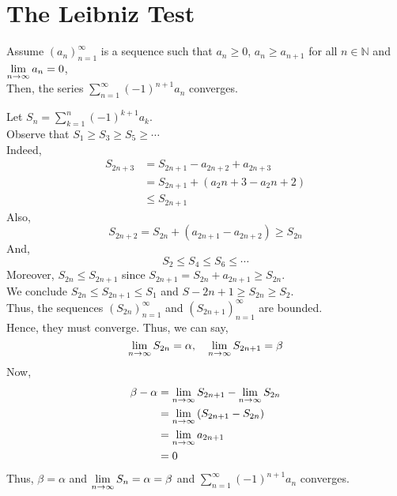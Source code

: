 \documentclass[12pt]{article}
\begin{document}
\section{The Leibniz Test}
\begin{theo}{}
Assume \(\left(a_n\right)_{n=1}^\infty\) is a sequence such that \(a_n \ge 0\), \(a_n \ge a_{n+1}\) for all \(n\in \mathbb N\) and \(\displaystyle\lim_{n\to\infty} a_n = 0\),\\
Then, the series \(\displaystyle\sum_{n=1}^\infty(-1)^{n+1}a_n\) converges.\\   
\end{theo}
\begin{prf}{}
Let \(S_n  = \displaystyle\sum_{k=1}^n(-1)^{k+1}a_k\).\\
Observe that \(S_1 \ge S_3 \ge S_5 \ge \cdots\)\\
Indeed, 
\begin{align*}
    S_{2n+3} &= S_{2n+1} - a_{2n + 2} + a_{2n+3}\\
    &= S_{2n+1} + \left(a_2n+3 - a_2n+2\right)\\
    &\le S_{2n+1}
\end{align*}  
Also, \[S_{2n+2} = S_{2n} + \left(a_{2n+1} - a_{2n+2}\right) \ge S_{2n} \]
And, \[S_2 \le S_4 \le S_6 \le \cdots\]
Moreover, \(S_{2n} \le S_{2n+1}\) since \(S_{2n+1} = S_{2n} + a_{2n+1} \ge S_{2n}\).\\
We conclude \(S_{2n} \le S_{2n+1} \le S_1\) and \(S-{2n+1} \ge S_{2n} \ge S_{2}\).\\
Thus, the sequences \(\left(S_{2n}\right)_{n=1}^\infty\) and \(\left(S_{2n+1}\right)_{n=1}^\infty\) are bounded.\\
Hence, they must converge. Thus, we can say, 
\[\displaystyle\lim_{n\to\infty}S_{2n} = \alpha, \quad \displaystyle\lim_{n\to\infty}S_{2n+1} = \beta\]
Now, 
\begin{align*}
\beta -\alpha &= \displaystyle\lim_{n\to\infty}S_{2n+1} - \displaystyle\lim_{n\to\infty}S_{2n}\\
&= \displaystyle\lim_{n\to\infty}\left(S_{2n+1} - S_{2n}\right)\\
&= \displaystyle\lim_{n\to\infty}a_{2n+1}\\
&= 0
\end{align*}
Thus, \(\beta = \alpha\) and \(\displaystyle\lim_{n\to\infty}S_n = \alpha = \beta\) and \(\displaystyle\sum_{n=1}^\infty(-1)^{n+1}a_n\) converges.
\end{prf}
\end{document}
